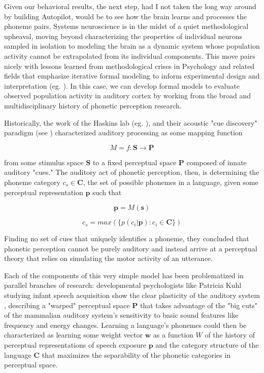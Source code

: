 Given our behavioral results, the next step, had I not taken the long way around by building Autopilot, would be to see how the brain learns and processes the phoneme pairs. Systems neuroscience is in the midst of a quiet methodological upheaval, moving beyond characterizing the properties of individual neurons sampled in isolation to modeling the brain as a dynamic system whose population activity cannot be extrapolated from its individual components. This move pairs nicely with lessons learned from methodological crises in Psychology and related fields that emphasize iterative formal modeling to inform experimental design and interpretation (eg. \cite{vanrooijTheoryTestHow2021}). In this case, we can develop formal models to evaluate observed population activity in auditory cortex by working from the broad and multidisciplinary history of phonetic perception research.

Historically, the work of the Haskins lab (eg. \cite{schertzPhoneticCueWeighting2020}), and their acoustic "cue discovery" paradigm (see \cite[p.~51]{ohalaGuideHistoryPhonetic1999}) characterized auditory processing as some mapping function 

\begin{equation}
\label{eqn:map}
M = f: \mathbf{S} \to \mathbf{P}
\end{equation} 

from some stimulus space $\mathbf{S}$ to a fixed\cite{Liberman1985a} perceptual space $\mathbf{P}$ composed of innate auditory "cues." The auditory act of phonetic perception, then, is determining the phoneme category $c_s \in \mathbf{C}$, the set of possible phonemes in a language, given some perceptual representation $\mathbf{p}$ such that

\begin{equation}
\label{eqn:pfroms}
\mathbf{p} = M(\mathbf{s})
\end{equation}

\begin{equation}
\label{eqn:infer}
c_s = max( \{ p(c_i | \mathbf{p}) : c_i \in \mathbf{C} \})
\end{equation}

Finding no set of cues that uniquely identifies a phoneme, they concluded that phonetic perception cannot be purely auditory and instead arrive at a perceptual theory that relies on simulating the motor activity of an utterance\cite{Liberman1985a}.

Each of the components of this very simple model has been problematized in parallel branches of research: developmental psychologists like Patricia Kuhl studying infant speech acquisition show the clear plasticity of the auditory system \cite{kuhlEarlyLanguageAcquisition2004}, describing a "warped" perceptual space $\mathbf{P}$ that takes advantage of the "big cuts" of the mammalian auditory system's sensitivity to basic sound features like frequency and energy changes. Learning a language's phonemes could then be characterized as learning some weight vector $\mathbf{w}$ as a function $W$ of the history of perceptual representations of speech exposure $\mathbf{p}$ and the category structure of the language $\mathbf{C}$ that maximizes the separability of the phonetic categories in perceptual space. 

